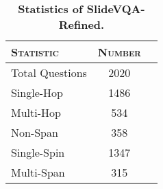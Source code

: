 \begin{table}[!h]
    \small
    \centering
    \caption{\textbf{Statistics of SlideVQA-Refined.}}
    \label{tab:data_statistic_slide}
    \begin{tabular}{lcc}
    \toprule
    \textsc{\textbf{Statistic}} & \textsc{\textbf{Number}}\\
    \midrule
    Total Questions & 2020\\
    \midrule
    Single-Hop & 1486 \\
    Multi-Hop & 534 \\
    \midrule
    Non-Span & 358\\
    Single-Spin & 1347 \\
    Multi-Span & 315 \\
    \bottomrule
    \end{tabular}
\end{table}